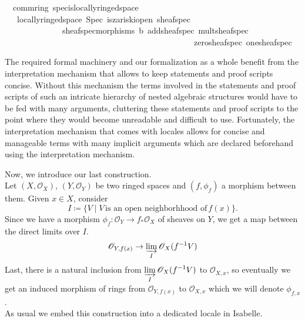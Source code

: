 \documentclass[12pt]{scrartcl}
\begin{document}
\begin{isabelle}
\isamarkupfalse%
\ {\isacharparenleft}{\kern0pt}\ comm{\isacharunderscore}{\kern0pt}ring{\isacharparenright}{\kern0pt}\ spec{\isacharunderscore}{\kern0pt}is{\isacharunderscore}{\kern0pt}locally{\isacharunderscore}{\kern0pt}ringed{\isacharunderscore}{\kern0pt}space{\isacharcolon}{\kern0pt}\isanewline
\ \ \ {\isachardoublequoteopen}locally{\isacharunderscore}{\kern0pt}ringed{\isacharunderscore}{\kern0pt}space\ Spec\ is{\isacharunderscore}{\kern0pt}zariski{\isacharunderscore}{\kern0pt}open\ sheaf{\isacharunderscore}{\kern0pt}spec\ \isanewline
\ \ \ \ \ \ \ \ \ \ \ \ \ \ sheaf{\isacharunderscore}{\kern0pt}spec{\isacharunderscore}{\kern0pt}morphisms\ {\isasymO}b\ add{\isacharunderscore}{\kern0pt}sheaf{\isacharunderscore}{\kern0pt}spec\ mult{\isacharunderscore}{\kern0pt}sheaf{\isacharunderscore}{\kern0pt}spec\ \isanewline
\ \ \ \ \ \ \ \ \ \ \ \ \ \ \ \ \ \ \ \ \ \ \ \ \ \ \ \ \ \ \ \ \ \ \ \ \ \ \ \ \ \ \ \ \ \ zero{\isacharunderscore}{\kern0pt}sheaf{\isacharunderscore}{\kern0pt}spec\ one{\isacharunderscore}{\kern0pt}sheaf{\isacharunderscore}{\kern0pt}spec{\isachardoublequoteclose}
\end{isabelle}

The required formal machinery and our formalization as a whole benefit from the interpretation mechanism that allows to keep statements and proof scripts concise. Without this mechanism the terms involved in the statements and proof scripts of such an intricate hierarchy of nested algebraic structures would have to be fed with many arguments, cluttering these statements and proof scripts to the point where they would become unreadable and difficult to use. Fortunately, the interpretation mechanism that comes with locales allows for concise and manageable terms with many implicit arguments which are declared beforehand using the interpretation mechanism.
  
Now, we introduce our last construction. \\
	Let $(X, \mathscr{O}_X)$, $(Y, \mathscr{O}_Y)$ be two ringed spaces and $(f, \phi_f)$ a morphism between them. Given $x \in X$, consider 
	\[
	I \coloneqq \lbrace V \mid V \, \text{is an open neighborhhood of}\, f(x) \rbrace .
	\]
	Since we have a morphism $\phi_f: \mathscr{O}_Y \rightarrow f_* \mathscr{O}_X $ of sheaves on $Y$, we get a map between the direct limits over $I$. 
	\[
	\mathscr{O}_{Y, f(x)} \rightarrow \displaystyle \varinjlim_I \mathscr{O}_X (f^{-1} V)
	\]
	Last, there is a natural inclusion from $\displaystyle \varinjlim_I \mathscr{O}_X (f^{-1} V)$ to $\mathscr{O}_{X, x}$, so eventually we get an induced morphism of rings from $\mathscr{O}_{Y, f(x)}$ to $\mathscr{O}_{X, x}$ which we will denote $\phi_{f, x}$. \\	
As usual we embed this construction into a dedicated locale in Isabelle.
\end{document}
